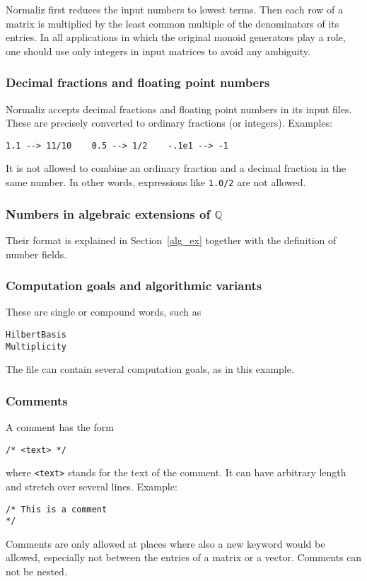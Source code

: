 \documentclass[12pt,a4paper]{scrartcl}
\theoremstyle{definition}
\def\QQ{{\mathbb Q}}
\def\ttt{\texttt}
\begin{document}
Normaliz first reduces the input numbers to lowest terms. Then each row of a matrix is multiplied by the least common multiple of the denominators of its entries. In all applications in which the original monoid generators play a role, one should use only integers in input matrices to avoid any ambiguity.

\subsubsection{Decimal fractions and floating point numbers}\label{decimal_input}

Normaliz accepts decimal fractions and floating point numbers in its input files. These are precisely converted to ordinary fractions (or integers). Examples:
\begin{Verbatim}
1.1 --> 11/10    0.5 --> 1/2    -.1e1 --> -1
\end{Verbatim}
It is not allowed to combine an ordinary fraction and a decimal fraction in the same number. In other words, expressions like \verb|1.0/2| are not allowed.

\subsubsection{Numbers in algebraic extensions of $\QQ$}\label{numberfield_input}

Their format is explained in Section~\ref{alg_ex} together with the definition of number fields.

\subsubsection{Computation goals and algorithmic variants}\label{subsecGoals}

These are single or compound words, such as
\begin{Verbatim}
HilbertBasis
Multiplicity
\end{Verbatim}
The file can contain several computation goals, as in this example.

\subsubsection{Comments}

A comment has the form
\begin{Verbatim}
/* <text> */
\end{Verbatim}
where \ttt{<text>} stands for the text of the comment. It can have arbitrary length and stretch over several lines. Example:
\begin{Verbatim}
/* This is a comment
*/
\end{Verbatim}
Comments are only allowed at places where also a new keyword would be allowed, especially not between the entries of a matrix or a vector. Comments can not be nested.
\end{document}
